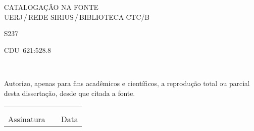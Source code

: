 %
% 


\begin{titlepage}
	\begin{center}
\vfill
\singlespacing
	\vspace*{95mm}
	{CATALOGAÇÃO NA FONTE\\ \vspace{1.5mm}
	UERJ\,/\,REDE SIRIUS\,/\,BIBLIOTECA CTC/B}\\
	\vspace{1.5mm}
	\begin{boxedminipage}{140mm}
	\begin{minipage}{5mm}
		\vspace{-84mm}
		S237
	\end{minipage}
	\hfill
	\vspace*{5mm}
	\begin{flushright}
	 CDU~621:528.8
	\end{flushright}
    \vspace{1mm}
	\end{boxedminipage}\\
	\end{center}
%
	Autorizo, apenas para fins acadêmicos e científicos, a reprodução total ou parcial desta dissertação, desde que citada a fonte.\\
	\noindent
	\begin{tabular}{ccc}
	\phantom{XXXXXXXXXXXXXXXXXXXXXXXXXXXXXX}&	 \phantom{XX}	&	\phantom{XXXXXXXXXXXXXXXX}	\\
	\phantom{XXXXXXXXXXXXXXXXXXXXXXXXXXXXXX}&	 \phantom{XX}	&	\phantom{XXXXXXXXXXXXXXXX}	\\
	\cline{1-1}\cline{3-3}
	Assinatura &		&	Data
	\end{tabular}
\end{titlepage} 